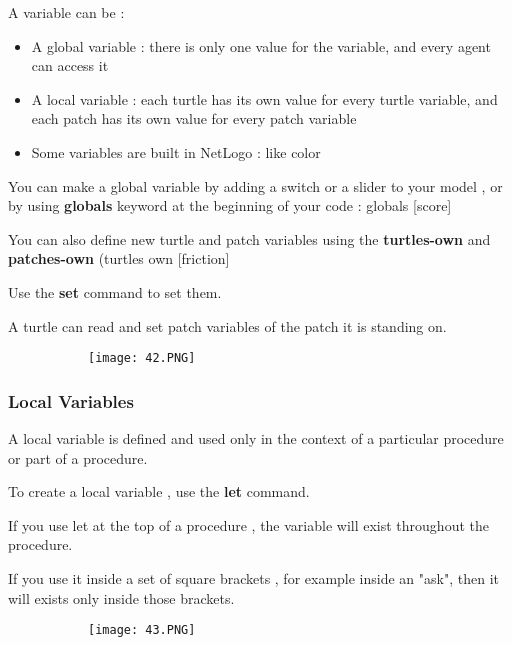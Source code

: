 \documentclass{article}
\begin{document}
A variable can be : 
\begin{itemize}
    \item A global variable : there is only one value for the variable, and every agent can access it
    \item A local variable : each turtle has its own value for every turtle variable, and each patch has its own value for every patch variable
    \item Some variables are built in NetLogo : like color
\end{itemize}

You can make a global variable by adding a switch or a slider to your model , or by using \textbf{globals} keyword at the beginning of your code : globals [score]

You can also define new turtle and patch variables using the \textbf{turtles-own} and \textbf{patches-own} (turtles own [friction]

Use the \textbf{set} command to set them.

A turtle can read and set patch variables of the patch it is standing on.

\begin{figure}[ht!]
  \centering
  \begin{subfigure}[b]{0.5\linewidth}
    \texttt{[image: 42.PNG]}
  \end{subfigure}
  \end{figure}

\subsubsection{Local Variables}

A local variable is defined and used only in the context of a particular procedure or part of a procedure.

To create a local variable , use the \textbf{let} command.

If you use let at the top of a procedure , the variable will exist throughout the procedure.

If you use it inside a set of square brackets , for example inside an "ask", then it will exists only inside those brackets.    

\begin{figure}[ht!]
  \centering
  \begin{subfigure}[b]{0.4\linewidth}
    \texttt{[image: 43.PNG]}
  \end{subfigure}
  \end{figure}
\end{document}
